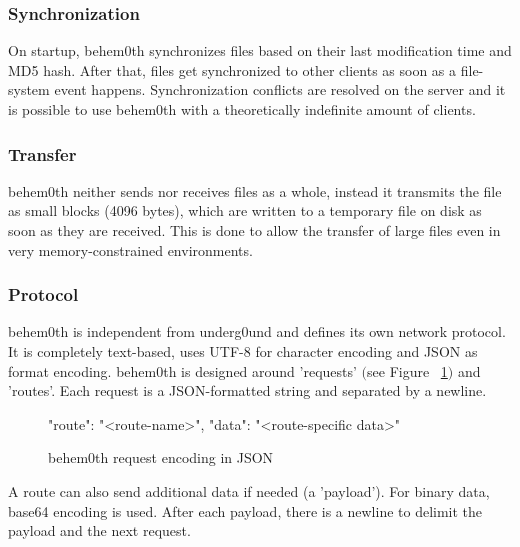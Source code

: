 \documentclass[conference]{IEEEtran}
\begin{document}
\subsubsection{Synchronization}
On startup, behem0th\cite{behem0th:Christoph Heiss} synchronizes files based on their last modification time and MD5 hash. After that, files get synchronized to other clients as soon as a file-system event happens. Synchronization conflicts are resolved on the server and it is possible to use behem0th\cite{behem0th:Christoph Heiss} with a theoretically indefinite amount of clients.\\

\subsubsection{Transfer}
behem0th\cite{behem0th:Christoph Heiss} neither sends nor receives files as a whole, instead it transmits the file as small blocks (4096 bytes), which are written to a temporary file on disk as soon as they are received. This is done to allow the transfer of large files even in very memory-constrained environments.\\

\subsubsection{Protocol}
behem0th\cite{behem0th:Christoph Heiss} is independent from underg0und and defines its own network protocol. It is completely text-based, uses UTF-8\cite{UTF-8:F. Yergeau} for character encoding and JSON\cite{JSON:T. Bray Ed.} as format encoding. behem0th\cite{behem0th:Christoph Heiss} is designed around 'requests' $($see Figure ~\ref{fig:behem0th_request}$)$ and 'routes'. Each request is a JSON-formatted string and separated by a newline.

\begin{figure}[H]
\centering
\begin{json}
{
    "route": "<route-name>",
    "data": "<route-specific data>"
}
\end{json}
\caption{behem0th request encoding in JSON\cite{JSON:T. Bray Ed.}}
\label{fig:behem0th_request}
\end{figure}

A route can also send additional data if needed (a 'payload'). For binary data, base64\cite{Base64:S. Josefsson} encoding is used. After each payload, there is a newline to delimit the payload and the next request. \\
\end{document}

